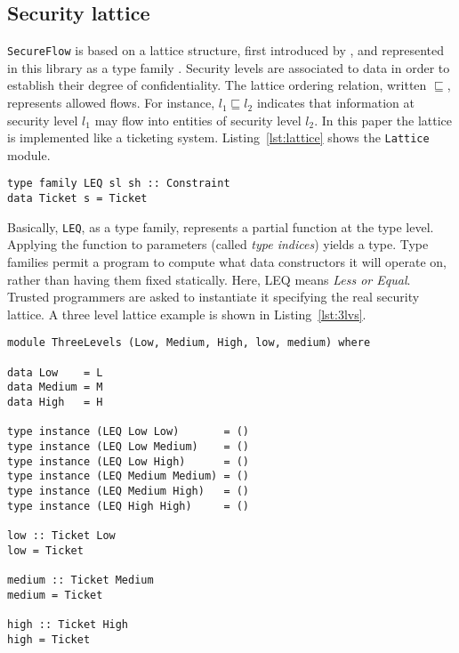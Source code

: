 \subsection{Security lattice}
\texttt{SecureFlow} is based on a lattice structure, first introduced by \citeauthor{denning1976lattice} \cite{denning1976lattice}, and represented in this library as a type family \cite{kiselyov2010fun}. Security levels are associated to data in order to establish their degree of confidentiality. The lattice ordering relation, written $\sqsubseteq$, represents allowed flows. For instance, $l_{1} \sqsubseteq l_{2}$ indicates that information at security level $l_{1}$ may flow into entities of security level $l_{2}$. In this paper the lattice is implemented like a ticketing system. Listing~\ref{lst:lattice} shows the \texttt{Lattice} module. 
\begin{lstlisting}[caption={The Lattice module}, label={lst:lattice}, breaklines=true]
type family LEQ sl sh :: Constraint
data Ticket s = Ticket
\end{lstlisting}
Basically, \texttt{LEQ}, as a type family, represents a partial function at the type level. Applying the function to parameters (called \textit{type indices}) yields a type. Type families permit a program to compute what data constructors it will operate on, rather than having them fixed statically. Here, LEQ means \textit{Less or Equal}. Trusted programmers are asked to instantiate it specifying the real security lattice. A three level lattice example is shown in Listing~\ref{lst:3lvs}.
\begin{lstlisting}[caption={Three levels lattice}, label={lst:3lvs}, breaklines=true]
module ThreeLevels (Low, Medium, High, low, medium) where

data Low    = L
data Medium = M
data High   = H

type instance (LEQ Low Low)       = ()
type instance (LEQ Low Medium)    = ()
type instance (LEQ Low High)      = ()
type instance (LEQ Medium Medium) = ()
type instance (LEQ Medium High)   = ()
type instance (LEQ High High)     = ()

low :: Ticket Low
low = Ticket

medium :: Ticket Medium
medium = Ticket

high :: Ticket High
high = Ticket
\end{lstlisting}
